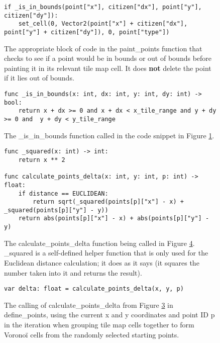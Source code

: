 \begin{figure}[H]
    \centering
    \begin{lstlisting}
if _is_in_bounds(point["x"], citizen["dx"], point["y"], citizen["dy"]):
    set_cell(0, Vector2(point["x"] + citizen["dx"], point["y"] + citizen["dy"]), 0, point["type"])
    \end{lstlisting}
    \caption{The appropriate block of code in the paint\_points function that checks to see if a point would be in bounds or out of bounds before painting it in its relevant tile map cell. It does \textbf{not} delete the point if it lies out of bounds.}
    \label{fig:voronoi6}
\end{figure}

\begin{figure}[H]
    \centering
    \begin{lstlisting}
func _is_in_bounds(x: int, dx: int, y: int, dy: int) -> bool:
	return x + dx >= 0 and x + dx < x_tile_range and y + dy >= 0 and  y + dy < y_tile_range
    \end{lstlisting}
    \caption{The \_is\_in\_bounds function called in the code snippet in Figure \ref{fig:voronoi6}.}
    \label{fig:voronoi7}
\end{figure}

\begin{figure}[H]
    \centering
    \begin{lstlisting}
func _squared(x: int) -> int:
	return x ** 2

func calculate_points_delta(x: int, y: int, p: int) -> float:
	if distance == EUCLIDEAN:
		return sqrt(_squared(points[p]["x"] - x) + _squared(points[p]["y"] - y))
	return abs(points[p]["x"] - x) + abs(points[p]["y"] - y)
    \end{lstlisting}
    \caption{The calculate\_points\_delta function being called in Figure \ref{fig:voronoi9}. \_squared is a self-defined helper function that is only used for the Euclidean distance calculation; it does as it says (it squares the number taken into it and returns the result).}
    \label{fig:voronoi8}
\end{figure}

\begin{figure}
    \centering
    \begin{lstlisting}
var delta: float = calculate_points_delta(x, y, p)
    \end{lstlisting}
    \caption{The calling of calculate\_points\_delta from Figure \ref{fig:voronoi8} in define\_points, using the current x and y coordinates and point ID p in the iteration when grouping tile map cells together to form Voronoï cells from the randomly selected starting points.}
    \label{fig:voronoi9}
\end{figure}